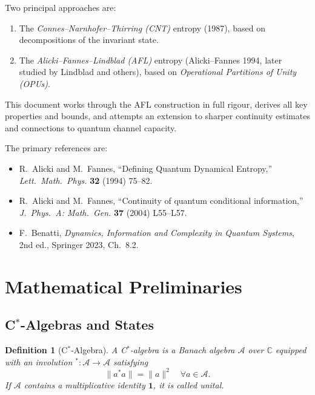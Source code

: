 \documentclass[12pt,a4paper]{article}
\newtheorem{definition}[theorem]{Definition}
\newcommand{\A}{\mathcal{A}}
\begin{document}
Two principal approaches are:
\begin{enumerate}
  \item The \emph{Connes--Narnhofer--Thirring (CNT)} entropy (1987), based on
        decompositions of the invariant state.
  \item The \emph{Alicki--Fannes--Lindblad (AFL)} entropy (Alicki--Fannes 1994,
        later studied by Lindblad and others), based on
        \emph{Operational Partitions of Unity (OPUs)}.
\end{enumerate}

This document works through the AFL construction in full rigour, derives all
key properties and bounds, and attempts an extension to sharper continuity
estimates and connections to quantum channel capacity.

The primary references are:
\begin{itemize}
  \item R.~Alicki and M.~Fannes, ``Defining Quantum Dynamical Entropy,''
        \emph{Lett.\ Math.\ Phys.} \textbf{32} (1994) 75--82.
  \item R.~Alicki and M.~Fannes, ``Continuity of quantum conditional
        information,'' \emph{J.\ Phys.\ A: Math.\ Gen.} \textbf{37} (2004)
        L55--L57.
  \item F.~Benatti, \emph{Dynamics, Information and Complexity in Quantum
        Systems}, 2nd ed., Springer 2023, Ch.~8.2.
\end{itemize}

\section{Mathematical Preliminaries}

\subsection{C\texorpdfstring{$^*$}{*}-Algebras and States}

\begin{definition}[C$^*$-Algebra]
A \emph{C$^*$-algebra} is a Banach algebra $\A$ over $\mathbb{C}$ equipped
with an involution ${}^*:\A\to\A$ satisfying
\[
  \|a^* a\| = \|a\|^2 \quad \forall a\in\A.
\]
If $\A$ contains a multiplicative identity $\mathbf{1}$, it is called
\emph{unital}.
\end{definition}
\end{document}
